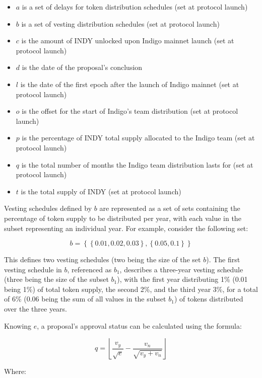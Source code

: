 \documentclass{article}
\begin{document}
\begin{sloppypar}
\begin{itemize}
\item
  \(a\) is a set of delays for token distribution schedules (set at
  protocol launch)
\item
  \(b\) is a set of vesting distribution schedules (set at protocol
  launch)
\item
  \(c\) is the amount of INDY unlocked upon Indigo mainnet launch (set
  at protocol launch)
\item
  \(d\) is the date of the proposal's conclusion
\item
  \(l\) is the date of the first epoch after the launch of Indigo
  mainnet (set at protocol launch)
\item
  \(o\) is the offset for the start of Indigo's team distribution (set
  at protocol launch)
\item
  \(p\) is the percentage of INDY total supply allocated to the Indigo
  team (set at protocol launch)
\item
  \(q\) is the total number of months the Indigo team distribution lasts
  for (set at protocol launch)
\item
  \(t\) is the total supply of INDY (set at protocol launch)
\end{itemize}

\filbreak

Vesting schedules defined by \(b\) are represented as a set of sets
containing the percentage of token supply to be distributed per year,
with each value in the subset representing an individual year. For
example, consider the following set:

\[b = \left\{ \left\{ 0.01,0.02,0.03 \right\},\left\{ 0.05,0.1 \right\} \right\}\]

This defines two vesting schedules (two being the size of the set
\(b\)). The first vesting schedule in \(b\), referenced as \(b_{1}\),
describes a three-year vesting schedule (three being the size of the
subset \(b_{1}\)), with the first year distributing 1\% (0.01 being 1\%)
of total token supply, the second 2\%, and the third year 3\%, for a
total of 6\% (0.06 being the sum of all values in the subset \(b_{1}\))
of tokens distributed over the three years.

Knowing \(e\), a proposal's approval status can be calculated using the
formula:

\[q = \left\lfloor \frac{v_{y}}{\sqrt{e}} - \frac{v_{n}}{\sqrt{v_{y} + v_{n}}} \right\rfloor\]

Where:


\end{sloppypar}
\end{document}
